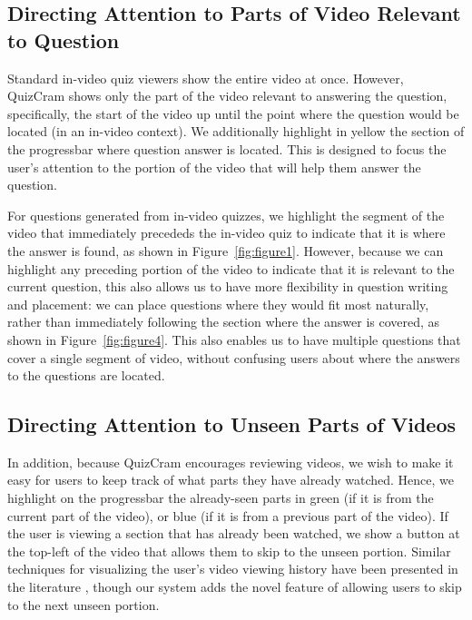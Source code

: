 \documentclass{chi-ext}
\begin{document}
\subsection{Directing Attention to Parts of Video Relevant to Question}

Standard in-video quiz viewers show the entire video at once. However, QuizCram shows only the part of the video relevant to answering the question, specifically, the start of the video up until the point where the question would be located (in an in-video context). We additionally highlight in yellow the section of the progressbar where question answer is located. This is designed to focus the user's attention to the portion of the video that will help them answer the question.


For questions generated from in-video quizzes, we highlight the segment of the video that immediately precededs the in-video quiz to indicate that it is where the answer is found, as shown in Figure~\ref{fig:figure1}. However, because we can highlight any preceding portion of the video to indicate that it is relevant to the current question, this also allows us to have more flexibility in question writing and placement: we can place questions where they would fit most naturally, rather than immediately following the section where the answer is covered, as shown in Figure~\ref{fig:figure4}. This also enables us to have multiple questions that cover a single segment of video, without confusing users about where the answers to the questions are located.

\subsection{Directing Attention to Unseen Parts of Videos}

In addition, because QuizCram encourages reviewing videos, we wish to make it easy for users to keep track of what parts they have already watched. Hence, we highlight on the progressbar the already-seen parts in green (if it is from the current part of the video), or blue (if it is from a previous part of the video). If the user is viewing a section that has already been watched, we show a button at the top-left of the video that allows them to skip to the unseen portion. Similar techniques for visualizing the user's video viewing history have been presented in the literature \cite{socialnavigation} \cite{lecturescape}, though our system adds the novel feature of allowing users to skip to the next unseen portion.
\end{document}
